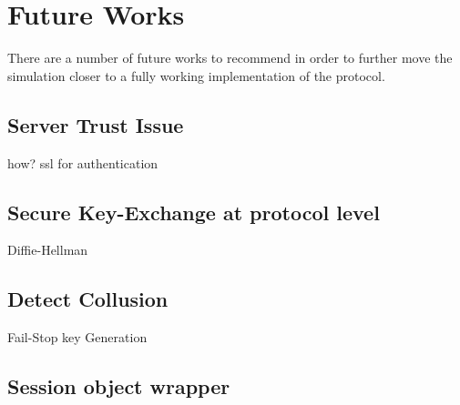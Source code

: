 \section{Future Works}
There are a number of future works to recommend in order to further move the simulation closer to a fully working implementation of the protocol.


\subsection{Server Trust Issue}
how? ssl for authentication

\subsection{Secure Key-Exchange at protocol level}
Diffie-Hellman

\subsection{Detect Collusion}
Fail-Stop key Generation

\subsection{Session object wrapper}